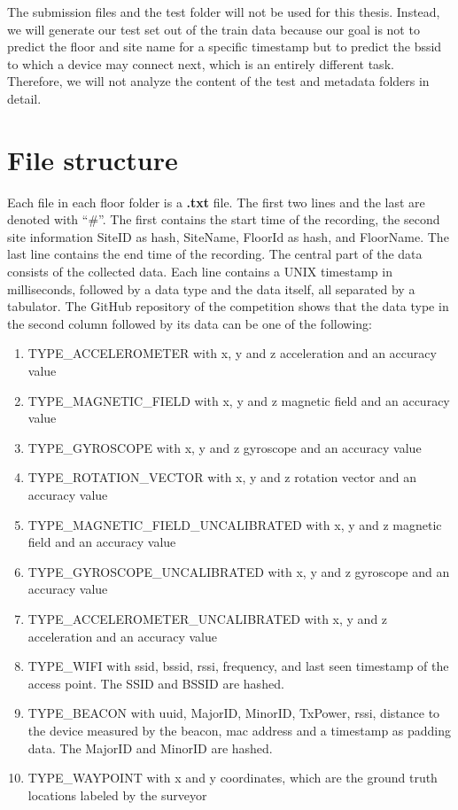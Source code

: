 The submission files and the test folder will not be used for this thesis.
Instead, we will generate our test set out of the train data because our goal is not to predict the floor and site name for a specific timestamp but to predict the \ac{bssid} to which a device may connect next, which is an entirely different task.
Therefore, we will not analyze the content of the test and metadata folders in detail.


\section{File structure}\label{sec:file-structure}

Each file in each floor folder is a \textbf{.txt} file. 
The first two lines and the last are denoted with ``\#''.
The first contains the start time of the recording, the second site information SiteID as hash, SiteName, FloorId as hash, and FloorName.
The last line contains the end time of the recording.
The central part of the data consists of the collected data. 
Each line contains a UNIX timestamp in milliseconds, followed by a data type and the data itself, all separated by a tabulator.
The GitHub repository of the competition \cite{GitHubComp} shows that the data type in the second column followed by its data can be one of the following:

\begin{enumerate}
    \item\label{type:acce} TYPE\_ACCELEROMETER with x, y and z acceleration and an accuracy value
    \item\label{type:mag} TYPE\_MAGNETIC\_FIELD with x, y and z magnetic field and an accuracy value
    \item\label{type:gyro} TYPE\_GYROSCOPE with x, y and z gyroscope and an accuracy value
    \item\label{type:rot} TYPE\_ROTATION\_VECTOR with x, y and z rotation vector and an accuracy value
    \item\label{type:mag_u} TYPE\_MAGNETIC\_FIELD\_UNCALIBRATED with x, y and z magnetic field and an accuracy value
    \item\label{type:gyro_u} TYPE\_GYROSCOPE\_UNCALIBRATED with x, y and z gyroscope and an accuracy value
    \item\label{type:acce_u} TYPE\_ACCELEROMETER\_UNCALIBRATED with x, y and z acceleration and an accuracy value
    \item\label{type:wifi} TYPE\_WIFI with \ac{ssid}, \ac{bssid}, \ac{rssi}, frequency, and last seen timestamp of the access point. The SSID and BSSID are hashed.
    \item\label{type:beacon} TYPE\_BEACON with \ac{uuid}, \ac{MajorID}, \ac{MinorID}, \ac{TxPower}, \ac{rssi}, distance to the device measured by the beacon, \ac{mac} address and a timestamp as padding data. The MajorID and MinorID are hashed.
    \item\label{type:way} TYPE\_WAYPOINT with x and y coordinates, which are the ground truth locations labeled by the surveyor
\end{enumerate}

